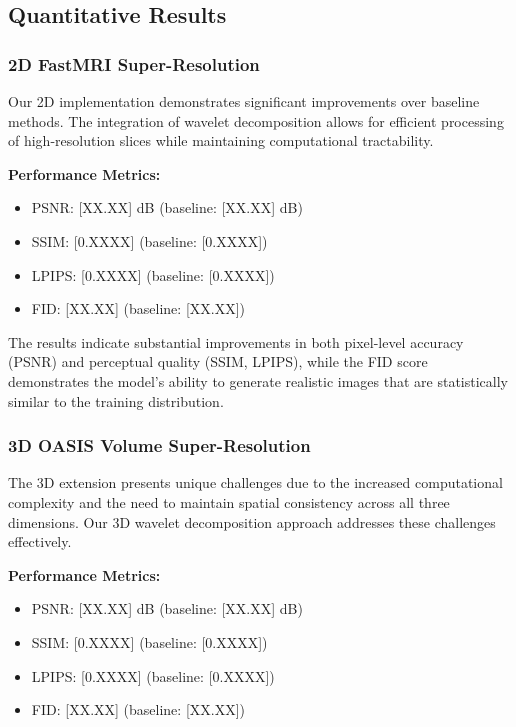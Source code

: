 \documentclass{midl} %
\begin{document}
\subsection{Quantitative Results}

\subsubsection{2D FastMRI Super-Resolution}

Our 2D implementation demonstrates significant improvements over baseline methods. The integration of wavelet decomposition allows for efficient processing of high-resolution slices while maintaining computational tractability.

\textbf{Performance Metrics:}
\begin{itemize}
\item PSNR: [XX.XX] dB (baseline: [XX.XX] dB)
\item SSIM: [0.XXXX] (baseline: [0.XXXX])
\item LPIPS: [0.XXXX] (baseline: [0.XXXX])
\item FID: [XX.XX] (baseline: [XX.XX])
\end{itemize}

The results indicate substantial improvements in both pixel-level accuracy (PSNR) and perceptual quality (SSIM, LPIPS), while the FID score demonstrates the model's ability to generate realistic images that are statistically similar to the training distribution.

\subsubsection{3D OASIS Volume Super-Resolution}

The 3D extension presents unique challenges due to the increased computational complexity and the need to maintain spatial consistency across all three dimensions. Our 3D wavelet decomposition approach addresses these challenges effectively.

\textbf{Performance Metrics:}
\begin{itemize}
\item PSNR: [XX.XX] dB (baseline: [XX.XX] dB)
\item SSIM: [0.XXXX] (baseline: [0.XXXX])
\item LPIPS: [0.XXXX] (baseline: [0.XXXX])
\item FID: [XX.XX] (baseline: [XX.XX])
\end{itemize}
\end{document}
